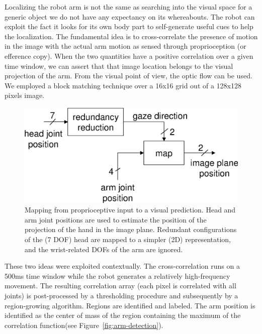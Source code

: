 \ifverbose
Localizing the robot arm is not the same as searching into the visual
space for a generic object we do not have any expectancy on its
whereabouts. The robot can exploit the fact it looks for its own body
part to self-generate useful cues to help the localization. The
fundamental idea is to cross-correlate the presence of motion in the
image with the actual arm motion as sensed through proprioception (or
efference copy). When the two quantities have a positive correlation
over a given time window, we can assert that that image location
belongs to the visual projection of the arm. From the visual point of
view, the optic flow can be used. We employed a block matching
technique over a 16x16 grid out of a 128x128 pixels image.
\fi


\ifverbose
\begin{figure}[tb]
\begin{center}
\includegraphics[width=\columnwidth]{mapping-reach.eps}
\caption{ 
\label{fig:mapping-reach}
%
Mapping from proprioceptive input to a visual prediction. Head and arm
joint positions are used to estimate the position of the projection of
the hand in the image plane.  Redundant configurations of the (7 DOF)
head are mapped to a simpler (2D) representation, and the wrist-related 
DOFs of the arm are ignored.
%
}
\end{center}
\end{figure}
\fi

\ifverbose
These two ideas were exploited contextually. The cross-correlation
runs on a 500ms time window while the robot generates a relatively
high-frequency movement. The resulting correlation array (each pixel
is correlated with all joints) is post-processed by a thresholding
procedure and subsequently by a region-growing algorithm. Regions are
identified and labeled. The arm position is identified as the center
of mass of the region containing the maximum of the correlation
function\iflong (see Figure~\ref{fig:arm-detection})\fi.
\fi

